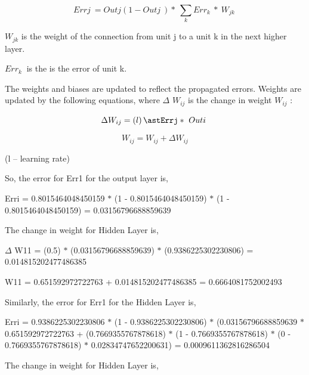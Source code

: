 \documentclass[12pt]{article}
\renewcommand{\_}{\kern-1.5pt\textunderscore\kern-1.5pt}
\begin{document}
 \[ Errj~= Outj  \left( 1 - Outj~ \right)  \ast~ \sum _{k}^{}Err_{k}~\ast~W_{jk}~ \] \par


\vspace{\baselineskip}
\tab  \( W_{jk} \)  is the weight of the connection from unit j to a unit k in the next higher layer. \par

 \( Err_{k}~ \) is the is the error of unit k.\par

The weights and biases are updated to reflect the propagated errors. Weights are updated by the following equations, where $ \Delta $   \( W_{ij} \)  is the change in weight  \( W_{ij} \) :\par

 \[  \Delta W_{ij} =  \left( l \right) \astErrj \ast~Outi~ \] \par

 \[ W_{ij}= W_{ij} +  \Delta W_{ij} \] \par

(l – learning rate)\par

So, the error for Err1 for the output layer is, \par

Erri = 0.8015464048450159 $\ast$  (1 - 0.8015464048450159) $\ast$  (1 - 0.8015464048450159) = 0.03156796688859639 \par

The change in weight for Hidden Layer is, \par

$ \Delta $  W11 = (0.5) $\ast$  (0.03156796688859639) $\ast$  (0.9386225302230806) = 0.014815202477486385 \par

W11 = 0.651592972722763 + 0.014815202477486385 = 0.6664081752002493 \par

Similarly, the error for Err1 for the Hidden Layer is, \par

Erri = 0.9386225302230806 $\ast$  (1 - 0.9386225302230806) $\ast$  (0.03156796688859639 $\ast$  0.651592972722763 + (0.7669355767878618) $\ast$  (1 - 0.7669355767878618) $\ast$  (0 - 0.7669355767878618) $\ast$  0.02834747652200631) = 0.0009611362816286504 \par

The change in weight for Hidden Layer is, \par
\end{document}
